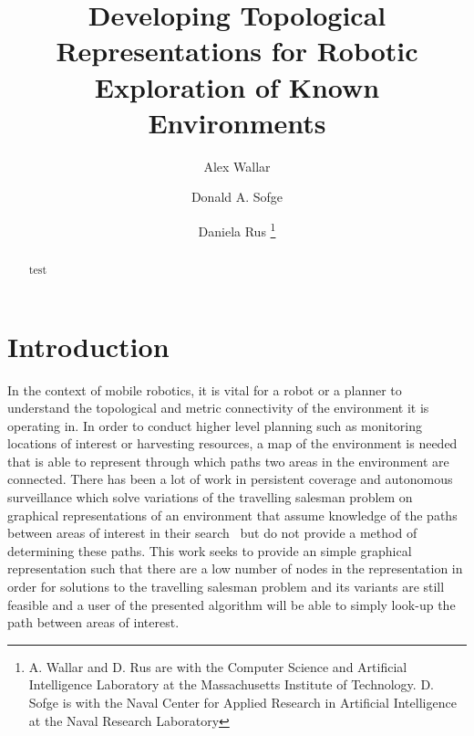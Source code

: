 \documentclass[letterpaper, 10pt, conference]{ieeeconf}
\begin{document}
\title{Developing Topological Representations for Robotic Exploration
    of Known Environments}


\author{Alex Wallar \and Donald A. Sofge \and Daniela Rus
\thanks{A. Wallar and D. Rus are with the Computer Science and Artificial
    Intelligence Laboratory at the Massachusetts Institute of Technology.
    D. Sofge is with the Naval Center for Applied Research in Artificial
    Intelligence at the Naval Research Laboratory}}

\maketitle

\begin{abstract}

    test

\end{abstract}

\section{Introduction}

In the context of mobile robotics, it is vital for a robot or a planner to
understand the topological and metric connectivity of the environment it is
operating in.  In order to conduct higher level planning such as monitoring
locations of interest or harvesting resources, a map of the environment is
needed that is able to represent through which paths two areas in the
environment are connected. There has been a lot of work in persistent coverage
and autonomous surveillance which solve variations of the travelling salesman
problem on graphical representations of an environment that assume knowledge of
the paths between areas of interest in their
search~\cite{yu2014correlated,sariel2009multiple,mitchell2015multi,
stump2011multi} but do not provide a method of determining these paths. This
work seeks to provide an simple graphical representation such that there are a
low number of nodes in the representation in order for solutions to the
travelling salesman problem and its variants are still feasible and a user of
the presented algorithm will be able to simply look-up the path between areas
of interest.
\end{document}
